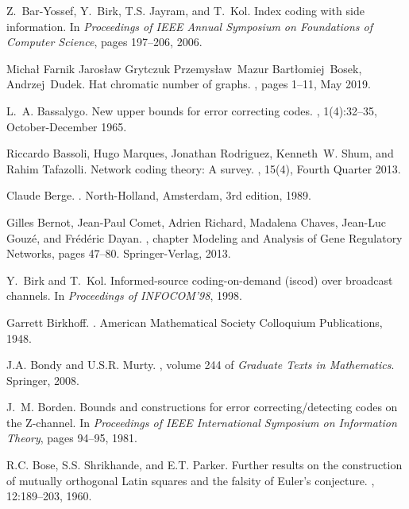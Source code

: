 \documentclass[a4paper, 11pt]{book}
\numberwithin{equation}{section}
\theoremstyle{plain}
\renewcommand{\(}{\ldbrack}
\renewcommand{\)}{\rdbrack}
\begin{document}
\begin{thebibliography}{100}
Z.~Bar-Yossef, Y.~Birk, T.S. Jayram, and T.~Kol.
\newblock Index coding with side information.
\newblock In {\em Proceedings of IEEE Annual Symposium on Foundations of
  Computer Science}, pages 197--206, 2006.

Micha\l{} Farnik Jaros\l{}aw Grytczuk Przemys\l{}aw~Mazur Bart\l{}omiej~Bosek,
  Andrzej~Dudek.
\newblock Hat chromatic number of graphs.
, pages 1--11, May 2019.

L.~A. Bassalygo.
\newblock New upper bounds for error correcting codes.
, 1(4):32--35,
  October-December 1965.

Riccardo Bassoli, Hugo Marques, Jonathan Rodriguez, Kenneth~W. Shum, and Rahim
  Tafazolli.
\newblock Network coding theory: A survey.
, 15(4), Fourth Quarter
  2013.

Claude Berge.
.
\newblock North-Holland, Amsterdam, 3rd edition, 1989.

Gilles Bernot, Jean-Paul Comet, Adrien Richard, Madalena Chaves, Jean-Luc
  Gouz\'e, and Fr\'ed\'eric Dayan.
, chapter
  Modeling and Analysis of Gene Regulatory Networks, pages 47--80.
\newblock Springer-Verlag, 2013.

Y.~Birk and T.~Kol.
\newblock Informed-source coding-on-demand (iscod) over broadcast channels.
\newblock In {\em Proceedings of INFOCOM'98}, 1998.

Garrett Birkhoff.
.
\newblock American Mathematical Society Colloquium Publications, 1948.

J.A. Bondy and U.S.R. Murty.
, volume 244 of {\em Graduate Texts in
  Mathematics}.
\newblock Springer, 2008.

J.~M. Borden.
\newblock Bounds and constructions for error correcting/detecting codes on the
  {Z}-channel.
\newblock In {\em Proceedings of IEEE International Symposium on Information
  Theory}, pages 94--95, 1981.

R.C. Bose, S.S. Shrikhande, and E.T. Parker.
\newblock Further results on the construction of mutually orthogonal {L}atin
  squares and the falsity of {E}uler's conjecture.
, 12:189--203, 1960.


\end{thebibliography}
\end{document}
